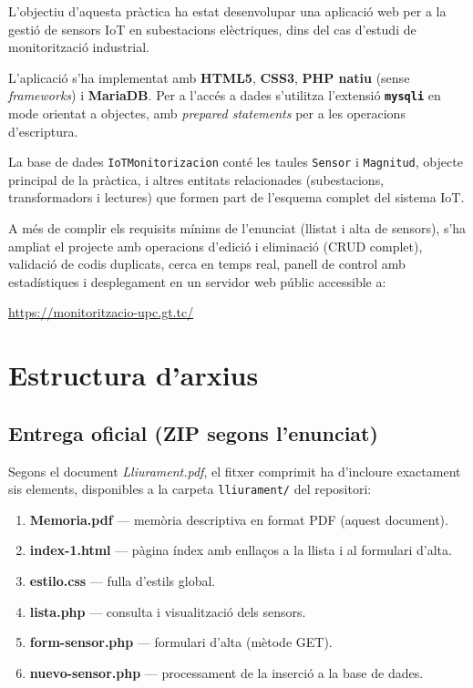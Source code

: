 \documentclass[12pt, a4paper]{article}
\begin{document}
L'objectiu d'aquesta pràctica ha estat desenvolupar una aplicació web per a la gestió de sensors IoT en subestacions elèctriques, dins del cas d'estudi de monitorització industrial.

L'aplicació s'ha implementat amb \textbf{HTML5}, \textbf{CSS3}, \textbf{PHP natiu} (sense \textit{frameworks}) i \textbf{MariaDB}. Per a l'accés a dades s'utilitza l'extensió \textbf{\texttt{mysqli}} en mode orientat a objectes, amb \textit{prepared statements} per a les operacions d'escriptura.

La base de dades \texttt{IoTMonitorizacion} conté les taules \texttt{Sensor} i \texttt{Magnitud}, objecte principal de la pràctica, i altres entitats relacionades (subestacions, transformadors i lectures) que formen part de l'esquema complet del sistema IoT.

A més de complir els requisits mínims de l'enunciat (llistat i alta de sensors), s'ha ampliat el projecte amb operacions d'edició i eliminació (CRUD complet), validació de codis duplicats, cerca en temps real, panell de control amb estadístiques i desplegament en un servidor web públic accessible a:

\begin{center}
  \url{https://monitoritzacio-upc.gt.tc/}
\end{center}

\section{Estructura d'arxius}

\subsection{Entrega oficial (ZIP segons l'enunciat)}

Segons el document \textit{Lliurament.pdf}, el fitxer comprimit ha d'incloure exactament sis elements, disponibles a la carpeta \texttt{lliurament/} del repositori:

\begin{enumerate}
  \item \textbf{Memoria.pdf} --- memòria descriptiva en format PDF (aquest document).
  \item \textbf{index-1.html} --- pàgina índex amb enllaços a la llista i al formulari d'alta.
  \item \textbf{estilo.css} --- fulla d'estils global.
  \item \textbf{lista.php} --- consulta i visualització dels sensors.
  \item \textbf{form-sensor.php} --- formulari d'alta (mètode GET).
  \item \textbf{nuevo-sensor.php} --- processament de la inserció a la base de dades.
\end{enumerate}
\end{document}
